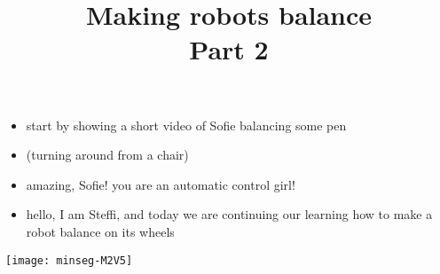 \newif	\ifexternalize					%
\newif	\ifshowonlynotes				%
\newif	\ifhandout						%
\newif	\ifshowsolutions				%
\newif	\ifshownotes					%
\ifdefined\EXTERNALIZE	\externalizetrue	\fi						%
\ifdefined\ONLYNOTES	\showonlynotestrue	\fi						%
\ifdefined\HANDOUT		\handouttrue		\fi						%
\ifdefined\SOLUTIONS	\showsolutionstrue	\fi						%
\ifdefined\NOTES		\shownotestrue		\fi						%
\title		[Balancing Robots]	{Making robots balance \\ Part 2}	%
\date		{} %


\begin{frame}
	\begin{itemize}
		\item start by showing a short video of Sofie balancing some pen
	\end{itemize}
\end{frame}


\begin{frame}
	\begin{itemize}
		\item (turning around from a chair)
		\item amazing, Sofie! you are an automatic control girl!
		\item hello, I am Steffi, and today we are continuing our learning how to make a robot balance on its wheels
	\end{itemize}
\end{frame}


\begin{frame}
	\titlepage
	\vspace{-1.8cm} 
	\begin{center}
		\texttt{[image: minseg-M2V5]}
	\end{center}
\end{frame}


